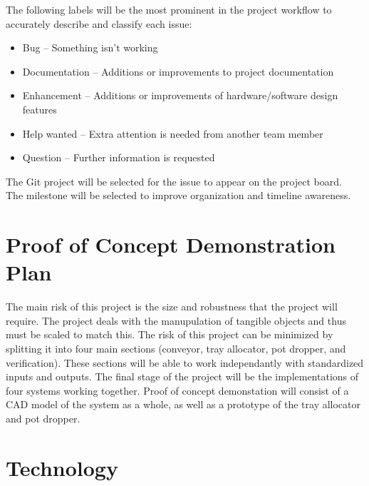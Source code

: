 \documentclass{article}
\begin{document}
	\noindent The following labels will be the most prominent in the project workflow to accurately describe and classify each issue: 

	\begin{itemize}
		\item Bug – Something isn’t working
		\item Documentation – Additions or improvements to project documentation 
		\item Enhancement – Additions or improvements of hardware/software design features 
		\item Help wanted – Extra attention is needed from another team member 
		\item Question – Further information is requested 
	\end{itemize}
	\noindent The Git project will be selected for the issue to appear on the project board.\\

	\noindent The milestone will be selected to improve organization and timeline awareness.\\
	
	\section{Proof of Concept Demonstration Plan}
	
	The main risk of this project is the size and robustness that the project will require. The project deals with the manupulation of tangible objects and thus must be scaled to match this.
	The risk of this project can be minimized by splitting it into four main sections (conveyor, tray allocator, pot dropper, and verification). These sections will be able to work independantly with standardized inputs and outputs. The final stage of the project will be 
	the implementations of four systems working together. Proof of concept demonstation will consist of a CAD model of the system as a whole, as well as a prototype of the tray allocator and pot dropper.
	
	
	\section{Technology}
	
\end{document}
